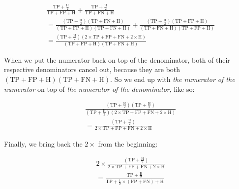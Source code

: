 \documentclass[12pt,letterpaper]{article}
\begin{document}
\begin{align*}
    &\frac{\text{TP}+\frac{\text{H}}{2}}
    {\text{TP}+\text{FP}+\text{H}}
    +
    \frac{\text{TP}+\frac{\text{H}}{2}}
    {\text{TP}+\text{FN}+\text{H}}\\[1.5ex]
    &=
    \frac{\left(
        \text{TP}+\frac{\text{H}}{2}
    \right)\left(
        \text{TP}+\text{FN}+\text{H}
    \right)}
    {\left(
        \text{TP}+\text{FP}+\text{H}
    \right)\left(
        \text{TP}+\text{FN}+\text{H}
    \right)}
    +
    \frac{\left(
        \text{TP}+\frac{\text{H}}{2}
    \right)\left(
        \text{TP}+\text{FP}+\text{H}
    \right)}
    {\left(
        \text{TP}+\text{FN}+\text{H}
    \right)\left(
        \text{TP}+\text{FP}+\text{H}
    \right)}\\[1.5ex]
    &=\frac{\left(
        \text{TP}+\frac{\text{H}}{2}
    \right)\left(
        2\times\text{TP} + \text{FP} + \text{FN} + 2\times\text{H}
    \right)}
    {\left(
        \text{TP}+\text{FP}+\text{H}
    \right)\left(
        \text{TP}+\text{FN}+\text{H}
    \right)}
\end{align*}

\noindent When we put the numerator back on top of the denominator, both of their respective denominators cancel out, because they are both $(\text{TP}+\text{FP}+\text{H})(\text{TP}+\text{FN}+\text{H})$.
So we end up with \emph{the numerator of the numerator} on top of \emph{the numerator of the denominator}, like so:

\begin{align*}
    &\frac{\left(
        \text{TP}+\frac{\text{H}}{2}
    \right)\left(
        \text{TP}+\frac{\text{H}}{2}
    \right)}
    {\left(
        \text{TP}+\frac{\text{H}}{2}
    \right)\left(
        2\times\text{TP} + \text{FP} + \text{FN} + 2\times\text{H}
    \right)}\\[1.5ex]
    &=
    \frac{\left(
        \text{TP}+\frac{\text{H}}{2}
    \right)}
    {2\times\text{TP} + \text{FP} + \text{FN} + 2\times\text{H}}
\end{align*}

\noindent Finally, we bring back the $2\times$ from the beginning:

\begin{align*}
    &2\times\frac{\left(
        \text{TP}+\frac{\text{H}}{2}
    \right)}
    {2\times\text{TP} + \text{FP} + \text{FN} + 2\times\text{H}}\\[1ex]
    &=
    \frac{\text{TP}+\frac{\text{H}}{2}}
    {\text{TP} + \frac{1}{2}\times(\text{FP} + \text{FN}) + \text{H}}
\end{align*}
\end{document}

